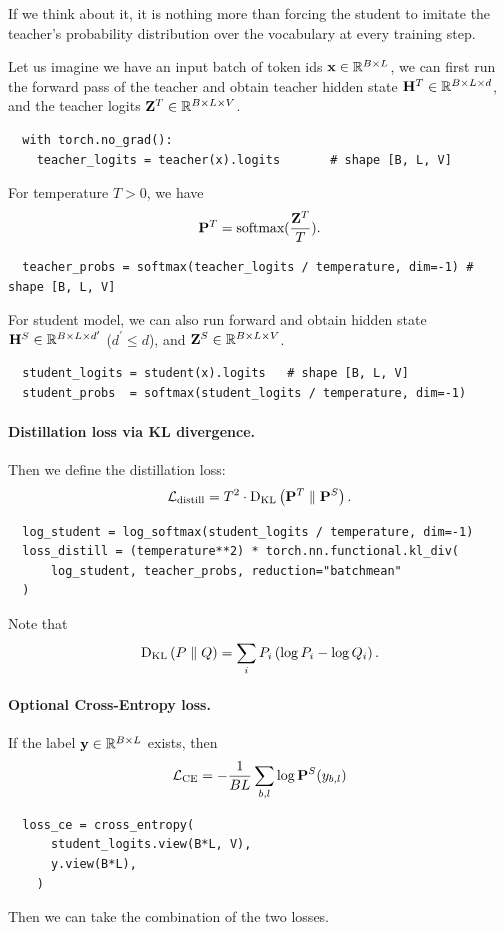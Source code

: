 \documentclass[11pt]{article}  %
\begin{document}
If we think about it, it is nothing more than forcing the student to imitate the teacher's probability distribution over the vocabulary at every training step.

Let us imagine we have an input batch of token ids $\mathbf{x} \in \mathbb{R}^{B \times L}$, we can first run the forward pass of the teacher and obtain teacher hidden state $\mathbf{H}^{T} \in \mathbb{R}^{B \times L \times d}$, and the teacher logits $\mathbf{Z}^{T} \in \mathbb{R}^{B \times L \times V}$.
\begin{lstlisting}
  with torch.no_grad():
    teacher_logits = teacher(x).logits       # shape [B, L, V]
\end{lstlisting}
For temperature $T > 0$, we have 
\begin{align*}
  \mathbf{P}^T = \text{softmax}(\frac{\mathbf{Z}^T}{T}).
\end{align*}
\begin{lstlisting}
  teacher_probs = softmax(teacher_logits / temperature, dim=-1) # shape [B, L, V]
\end{lstlisting}
For student model, we can also run forward and obtain hidden state $\mathbf{H}^S \in \mathbb{R}^{B \times L \times d^\prime}$ ($d^\prime \leq d$), and $\mathbf{Z}^S \in \mathbb{R}^{B \times L \times V}$.
\begin{lstlisting}
  student_logits = student(x).logits   # shape [B, L, V]
  student_probs  = softmax(student_logits / temperature, dim=-1)
\end{lstlisting}

\paragraph{Distillation loss via KL divergence.}
Then we define the distillation loss: 
\begin{align*}
  \mathcal{L}_{\text{distill}} = T^2 \cdot {\rm D}_{\text{KL}}\left( \mathbf{P}^T \parallel \mathbf{P}^S \right).
\end{align*}
\begin{lstlisting}
  log_student = log_softmax(student_logits / temperature, dim=-1)
  loss_distill = (temperature**2) * torch.nn.functional.kl_div(
      log_student, teacher_probs, reduction="batchmean"
  )
\end{lstlisting}
Note that 
\begin{align*}
  {\rm D}_{\text{KL}}\left( P \parallel Q \right) = \sum_{i}P_i \left( \log P_i - \log Q_i \right).
\end{align*}

\paragraph{Optional Cross-Entropy loss.}
If the label $\mathbf{y} \in \mathbb{R}^{B \times L}$ exists, then  
\begin{align*}
  \mathcal{L}_{\text{CE}} = -\frac{1}{BL}\sum_{b, l} \log \mathbf{P}^S(y_{b, l})
\end{align*}
\begin{lstlisting}
  loss_ce = cross_entropy(
      student_logits.view(B*L, V),
      y.view(B*L),
    )
\end{lstlisting}
Then we can take the combination of the two losses.
\end{document}
